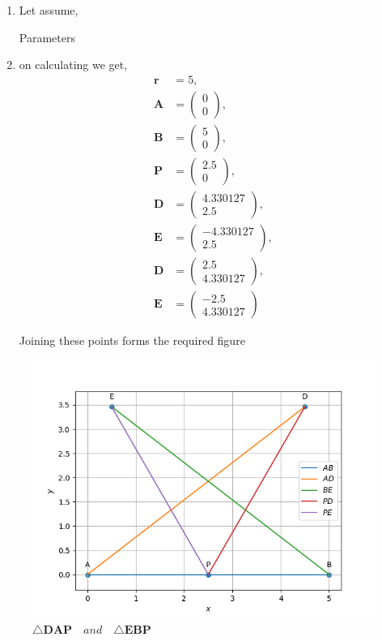 \documentclass[11pt, a4paper]{article}
\newcommand{\myvec}[1]{\ensuremath{\begin{pmatrix}#1\end{pmatrix}}}
\let\vec\mathbf
\begin{document}
\begin{enumerate}
\begin{enumerate}[label=(\roman*)]
\item Let assume, 
\begin{table}[H]
\centering
	
	  \caption{Parameters}
	  \label{Table}
\end{table}

\item on calculating we get,
\begin{align}
\vec{r} &= 5,\\
\vec{A} &= \myvec{0 \\ 0},\\
\vec{B} &= \myvec{5 \\ 0} ,\\
\vec{P} &= \myvec{2.5 \\ 0} ,\\
\vec{D} &= \myvec{ 4.330127 \\ 2.5 } ,\\
\vec{E} &= \myvec{-4.330127  \\ 2.5 },\\
\vec{D} &= \myvec{ 2.5 \\ 4.330127 } ,\\
\vec{E} &= \myvec{ -2.5 \\ 4.330127 }
\end{align}

Joining these points forms the required figure

\end{enumerate}
\end{enumerate}

\begin{figure}[H]
    \includegraphics[width=\columnwidth]{figs/fig_mat_comp.png}
	\caption{$\triangle \vec{DAP} \hspace{12pt} and \hspace{12pt} \triangle \vec{EBP}$}
    \label{fig:fig2}
\end{figure}
\end{document}
